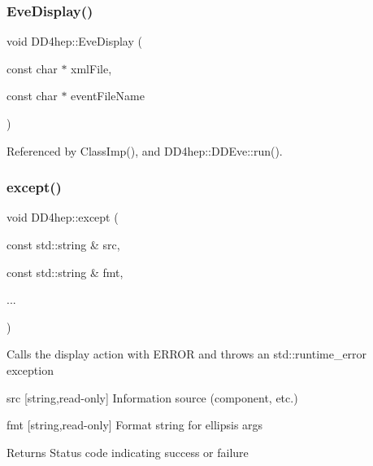 \hypertarget{namespace_d_d4hep_abf73c406aa34c4fe6bd8af3985bdd888}{}\label{namespace_d_d4hep_abf73c406aa34c4fe6bd8af3985bdd888} 
\subsubsection{\texorpdfstring{Eve\+Display()}{EveDisplay()}}
{\footnotesize\ttfamily void D\+D4hep\+::\+Eve\+Display (\begin{DoxyParamCaption}\item[{const char $\ast$}]{xml\+File,  }\item[{const char $\ast$}]{event\+File\+Name }\end{DoxyParamCaption})}



Referenced by Class\+Imp(), and D\+D4hep\+::\+D\+D\+Eve\+::run().

\hypertarget{namespace_d_d4hep_af8602b0b80e0c252cf28e5fbbc81abcc}{}\label{namespace_d_d4hep_af8602b0b80e0c252cf28e5fbbc81abcc} 
\subsubsection{\texorpdfstring{except()}{except()}\hspace{0.1cm}{\footnotesize\ttfamily [1/4]}}
{\footnotesize\ttfamily void D\+D4hep\+::except (\begin{DoxyParamCaption}\item[{const std\+::string \&}]{src,  }\item[{const std\+::string \&}]{fmt,  }\item[{}]{... }\end{DoxyParamCaption})}

Calls the display action with E\+R\+R\+OR and throws an std\+::runtime\+\_\+error exception \begin{DoxyItemize}
\item src \mbox{[}string,read-\/only\mbox{]} Information source (component, etc.) \item fmt \mbox{[}string,read-\/only\mbox{]} Format string for ellipsis args \begin{DoxyReturn}{Returns}
Status code indicating success or failure 
\end{DoxyReturn}
\end{DoxyItemize}



